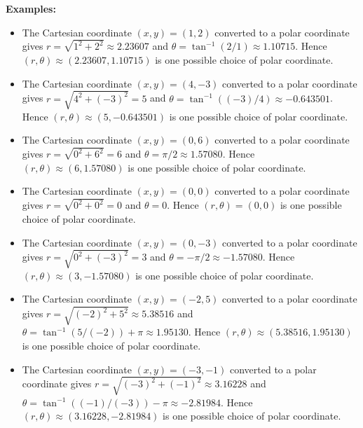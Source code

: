 \documentclass{article}
\begin{document}
\textbf{Examples:}
\begin{itemize}
\item The Cartesian coordinate \((x, y) = (1, 2)\) converted to a polar coordinate gives \(r = \sqrt{1^2 + 2^2} \approx 2.23607\) and \(\theta = \tan^{-1}(2/1) \approx 1.10715\). Hence \((r, \theta) \approx (2.23607, 1.10715)\) is one possible choice of polar coordinate. 
\item The Cartesian coordinate \((x, y) = (4, -3)\) converted to a polar coordinate gives \(r = \sqrt{4^2 + (-3)^2} = 5\) and \(\theta = \tan^{-1}((-3)/4) \approx -0.643501\). Hence \((r, \theta) \approx (5, -0.643501)\) is one possible choice of polar coordinate. 
\item The Cartesian coordinate \((x, y) = (0, 6)\) converted to a polar coordinate gives \(r = \sqrt{0^2 + 6^2} = 6\) and \(\theta = \pi/2 \approx 1.57080\). Hence \((r, \theta) \approx (6, 1.57080)\) is one possible choice of polar coordinate.  
\item The Cartesian coordinate \((x, y) = (0, 0)\) converted to a polar coordinate gives \(r = \sqrt{0^2 + 0^2} = 0\) and \(\theta = 0\). Hence \((r, \theta) = (0, 0)\) is one possible choice of polar coordinate.
\item The Cartesian coordinate \((x, y) = (0, -3)\) converted to a polar coordinate gives \(r = \sqrt{0^2 + (-3)^2} = 3\) and \(\theta = -\pi/2 \approx -1.57080\). Hence \((r, \theta) \approx (3, -1.57080)\) is one possible choice of polar coordinate.
\item The Cartesian coordinate \((x, y) = (-2, 5)\) converted to a polar coordinate gives \(r = \sqrt{(-2)^2 + 5^2} \approx 5.38516\) and \(\theta = \tan^{-1}(5/(-2)) + \pi \approx 1.95130\). Hence \((r, \theta) \approx (5.38516, 1.95130)\) is one possible choice of polar coordinate. 
\item The Cartesian coordinate \((x, y) = (-3, -1)\) converted to a polar coordinate gives \(r = \sqrt{(-3)^2 + (-1)^2} \approx 3.16228\) and \(\theta = \tan^{-1}((-1)/(-3)) - \pi \approx -2.81984\). Hence \((r, \theta) \approx (3.16228, -2.81984)\) is one possible choice of polar coordinate. 
\end{itemize}
\end{document}

